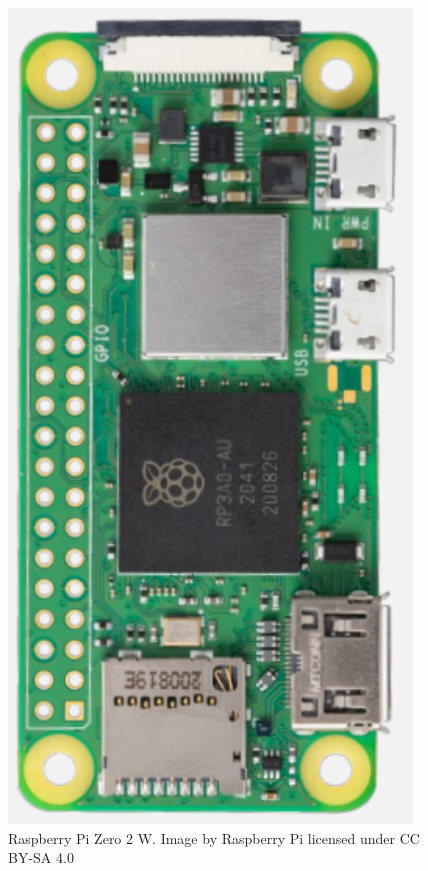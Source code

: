 \begin{figure}[h]
    \centering
    \begin{minipage}[b]{0.45\textwidth}
        \centering
        \includegraphics[width=.6\textwidth]{Imagenes/Vectorial/piZero2W.pdf}
        \caption{Raspberry Pi Zero 2 W. Image by Raspberry Pi licensed under CC BY-SA 4.0}
        \label{fig:piZero2W}
    \end{minipage}
    \hfill
    \begin{minipage}[b]{0.45\textwidth}
        \centering

\end{minipage}
\end{figure}
